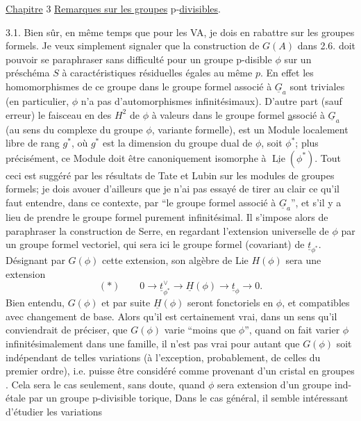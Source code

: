 \uline{Chapitre} 3 \uline{Remarques sur les groupes} p-\uline{divisibles}.

3.1. Bien sûr, en même temps que pour les VA, je dois en rabattre sur les groupes formels. Je veux simplement signaler que la construction de $G(A)$ dans 2.6. doit pouvoir se paraphraser sans difficulté pour un groupe p-disible $\phi$ sur un préschéma $S$ à caractéristiques résiduelles égales au même $p$. En effet les homomorphismes de ce groupe dans le groupe formel associé à $\underline{G}_a$ sont triviales (en particulier, $\phi$ n'a pas d'automorphismes infinitésimaux). D'autre part (sauf erreur) le faisceau en   des $H^2$ de $\phi$ à valeurs dans le groupe formel \uline{a}ssocié à $\underline{G}_a$ (au sens du complexe du groupe $\phi$, variante formelle), est un Module localement libre de rang $g^*$, où $g^*$ est la dimension du groupe dual de $\phi$, soit $\phi^*$; plus précisément, ce Module doit être canoniquement isomorphe à $\underline{\operatorname{Lie}}(\phi^*)$. \inserted{(}Tout ceci est suggéré par les résultats de Tate et Lubin sur les modules de groupes formels; je dois avouer d'ailleurs que je n'ai pas essayé de tirer au clair ce qu'il faut entendre, dans ce contexte, par ``le groupe formel associé à $\underline{G}_a$'', et s'il y a lieu de prendre le groupe formel purement infinitésimal.\inserted{)} Il s'impose alors de paraphraser la construction de Serre, en regardant l'extension  universelle de $\phi$ par un groupe formel vectoriel, qui sera ici le groupe formel (covariant) de $\underline{t}_{\phi^*}$. Désignant par $G(\phi)$ cette extension, son algèbre de Lie $H(\phi)$ sera une extension
\[
(*)\qquad 0\longrightarrow\underline{t}_{\phi^*}^{\vee}\longrightarrow\underline{H}(\phi)\longrightarrow\underline{t}_{\phi}\longrightarrow0.
\]
Bien entendu, $G(\phi)$ et par suite $\underline{H}(\phi)$ seront fonctoriels en $\phi$, et compatibles avec changement de base. Alors qu'il est certainement vrai, dans un sens qu'il conviendrait de préciser, que  $G(\phi)$ varie ``moins que $\phi$'', quand on fait varier $\phi$ infinitésimalement dans une famille, il n'est pas vrai pour autant que $G(\phi)$ soit indépendant de telles variations (à l'exception, probablement, de celles du premier ordre), i.e. puisse être considéré comme provenant d'un cristal en groupes  . Cela sera le cas\deleted{,} seulement, sans doute, quand $\phi$ sera extension d'un groupe  ind-étale par un groupe p-divisible torique,  Dans le cas général, il semble intéressant d'étudier les variations
